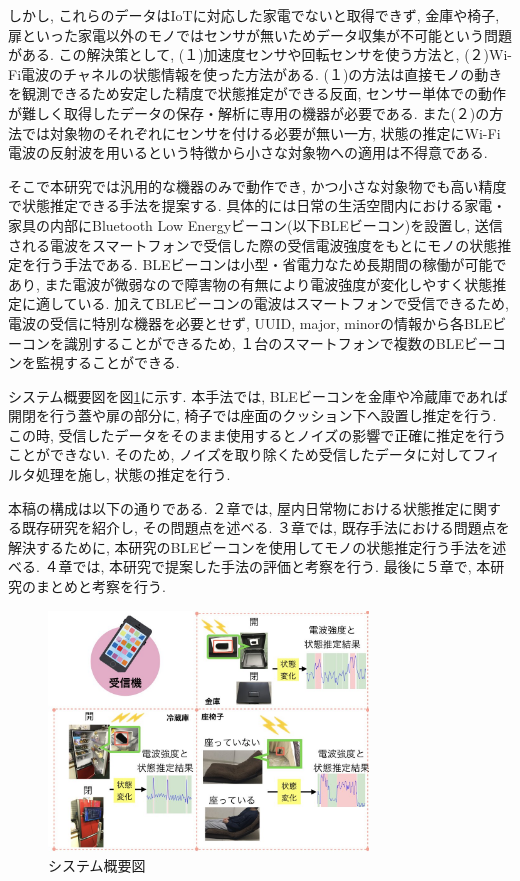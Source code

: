 \documentclass[Japanese]{dicomopapers}
\begin{document}
しかし, これらのデータはIoTに対応した家電でないと取得できず, 金庫や椅子, 扉といった家電以外のモノではセンサが無いためデータ収集が不可能という問題がある.
この解決策として, (１)加速度センサや回転センサを使う方法と, (２)Wi-Fi電波のチャネルの状態情報を使った方法がある.
(１)の方法は直接モノの動きを観測できるため安定した精度で状態推定ができる反面, センサー単体での動作が難しく取得したデータの保存・解析に専用の機器が必要である. %
また(２)の方法では対象物のそれぞれにセンサを付ける必要が無い一方, 状態の推定にWi-Fi電波の反射波を用いるという特徴から小さな対象物への適用は不得意である.

そこで本研究では汎用的な機器のみで動作でき, かつ小さな対象物でも高い精度で状態推定できる手法を提案する.
具体的には日常の生活空間内における家電・家具の内部にBluetooth Low Energyビーコン(以下BLEビーコン)を設置し, 送信される電波をスマートフォンで受信した際の受信電波強度をもとにモノの状態推定を行う手法である.
BLEビーコンは小型・省電力なため長期間の稼働が可能であり, また電波が微弱なので障害物の有無により電波強度が変化しやすく状態推定に適している.
加えてBLEビーコンの電波はスマートフォンで受信できるため, 電波の受信に特別な機器を必要とせず, UUID, major, minorの情報から各BLEビーコンを識別することができるため, １台のスマートフォンで複数のBLEビーコンを監視することができる.

システム概要図を図\ref{abst}に示す.
本手法では, BLEビーコンを金庫や冷蔵庫であれば開閉を行う蓋や扉の部分に, 椅子では座面のクッション下へ設置し推定を行う.
この時, 受信したデータをそのまま使用するとノイズの影響で正確に推定を行うことができない.
そのため, ノイズを取り除くため受信したデータに対してフィルタ処理を施し, 状態の推定を行う.

本稿の構成は以下の通りである.
２章では, 屋内日常物における状態推定に関する既存研究を紹介し, その問題点を述べる.
３章では, 既存手法における問題点を解決するために, 本研究のBLEビーコンを使用してモノの状態推定行う手法を述べる.
４章では, 本研究で提案した手法の評価と考察を行う.
最後に５章で, 本研究のまとめと考察を行う.



\begin{figure}[ht]
 \centering
 \includegraphics[width=8.5cm]{abst.jpeg}
 \caption{システム概要図}
 \label{abst}
\end{figure}
\end{document}
